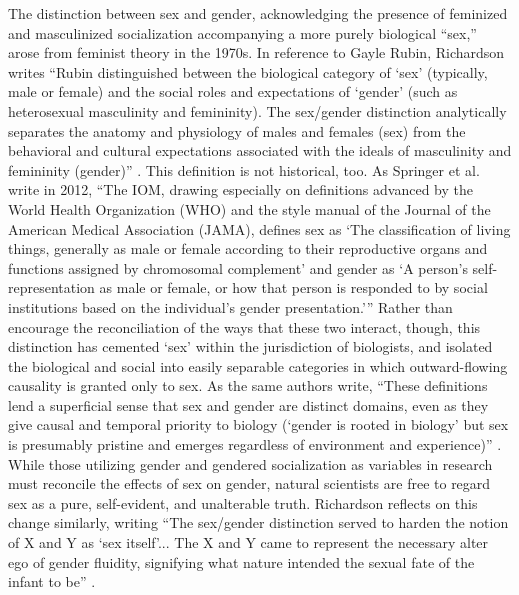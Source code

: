 \hspace{13pt} The distinction between sex and gender, acknowledging the presence of feminized and masculinized socialization accompanying a more purely biological ``sex,'' arose from feminist theory in the 1970s. In reference to Gayle Rubin, Richardson writes ``Rubin distinguished between the biological category of `sex' (typically, male or female) and the social roles and expectations of `gender' (such as heterosexual masculinity and femininity). The sex/gender distinction analytically separates the anatomy and physiology of males and females (sex) from the behavioral and cultural expectations associated with the ideals of masculinity and femininity (gender)'' \cite{richardson2013sex}. This definition is not historical, too. As Springer et al. write in 2012, ``The IOM, drawing especially on definitions advanced by the World Health Organization (WHO) and the style manual of the Journal of the American Medical Association (JAMA), defines sex as `The classification of living things, generally as male or female according to their reproductive organs and functions assigned by chromosomal complement' and gender as `A person’s self-representation as male or female, or how that person is responded to by social institutions based on the individual’s gender presentation.'\thinspace'' Rather than encourage the reconciliation of the ways that these two interact, though, this distinction has cemented `sex' within the jurisdiction of biologists, and isolated the biological and social into easily separable categories in which outward-flowing causality is granted only to sex. As the same authors write, ``These definitions lend a superficial sense that sex and gender are distinct domains, even as they give causal and temporal priority to biology (`gender is rooted in biology' but sex is presumably pristine and emerges regardless of environment and experience)'' \cite{springer2012beyond}. While those utilizing gender and gendered socialization as variables in research must reconcile the effects of sex on gender, natural scientists are free to regard sex as a pure, self-evident, and unalterable truth. Richardson reflects on this change similarly, writing ``The sex/gender distinction served to harden the notion of X and Y as `sex itself'... The X and Y came to represent the necessary alter ego of gender fluidity, signifying what nature intended the sexual fate of the infant to be'' \cite{richardson2013sex}.

